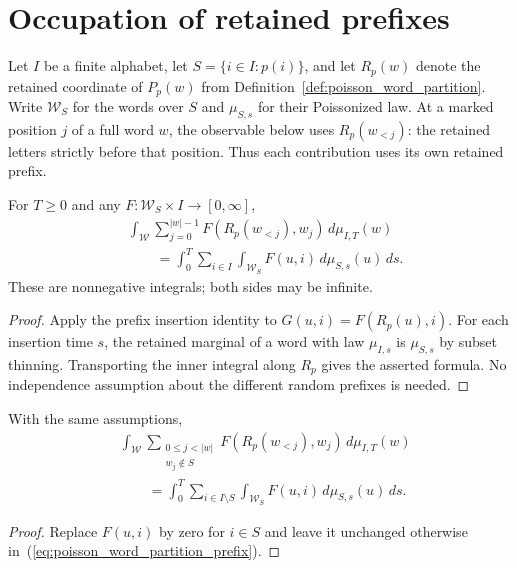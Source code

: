 \section{Occupation of retained prefixes}
\label{sec:poisson_word_occupation}

Let $I$ be a finite alphabet, let $S=\{i\in I:p(i)\}$, and let
$R_p(w)$ denote the retained coordinate of $P_p(w)$ from
Definition~\ref{def:poisson_word_partition}.  Write $\mathcal W_S$
for the words over $S$ and $\mu_{S,s}$ for their Poissonized law.
At a marked position $j$ of a full word $w$, the observable below uses
$R_p(w_{<j})$: the retained letters strictly before that position.
Thus each contribution uses its own retained prefix.

\begin{theorem}
\label{thm:poisson_word_partition_prefix}
\leanok
{}
For $T\geq0$ and any $F:\mathcal W_S\times I\to[0,\infty]$,
\begin{equation}
\label{eq:poisson_word_partition_prefix}
\begin{aligned}
 &\int_{\mathcal W}\sum_{j=0}^{|w|-1}
 F(R_p(w_{<j}),w_j)\,d\mu_{I,T}(w)\\
 &\qquad=\int_0^T\sum_{i\in I}\int_{\mathcal W_S}
 F(u,i)\,d\mu_{S,s}(u)\,ds.
\end{aligned}
\end{equation}
These are nonnegative integrals; both sides may be infinite.
\end{theorem}
\begin{proof}
\leanok
{}
Apply the prefix insertion identity to $G(u,i)=F(R_p(u),i)$.
For each insertion time $s$, the retained marginal of a word with law
$\mu_{I,s}$ is $\mu_{S,s}$ by subset thinning.  Transporting the inner
integral along $R_p$ gives the asserted formula.  No independence
assumption about the different random prefixes is needed.
\end{proof}

\begin{corollary}
\label{cor:poisson_word_omitted_prefix}
\leanok
{}
With the same assumptions,
\begin{equation}
\label{eq:poisson_word_omitted_prefix}
\begin{aligned}
 &\int_{\mathcal W}
 \sum_{\substack{0\leq j<|w|\\w_j\notin S}}
 F(R_p(w_{<j}),w_j)\,d\mu_{I,T}(w)\\
 &\qquad=\int_0^T\sum_{i\in I\setminus S}
 \int_{\mathcal W_S}F(u,i)\,d\mu_{S,s}(u)\,ds.
\end{aligned}
\end{equation}
\end{corollary}
\begin{proof}
\leanok
Replace $F(u,i)$ by zero for $i\in S$ and leave it unchanged otherwise
in~(\ref{eq:poisson_word_partition_prefix}).
\end{proof}

